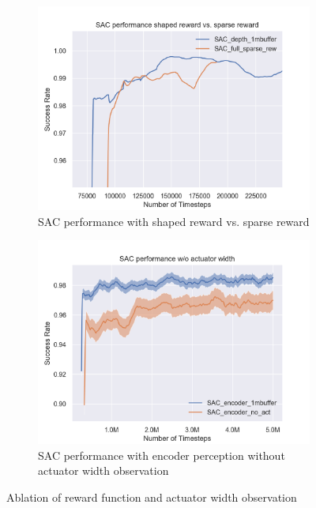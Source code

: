 \begin{figure}[htbp]
    \begin{subfigure}{0.49\textwidth}
        \includegraphics[width=\linewidth]{figures/ablation/SAC_performance_shaped_reward_vs_sparse_reward}
        \caption{SAC performance with shaped reward vs. sparse reward } \label{fig:table}
    \end{subfigure}%
    \hspace*{\fill}   %
    \begin{subfigure}{0.49\textwidth}
        \includegraphics[width=\linewidth]{figures/ablation/SAC_performance_wo_actuator_width}
        \caption{SAC performance with encoder perception without actuator width observation} \label{fig:noact}
    \end{subfigure}%
    \hspace*{\fill}   %


\caption{ Ablation of reward function and actuator width observation \label{fig:scenes}}
\end{figure}

